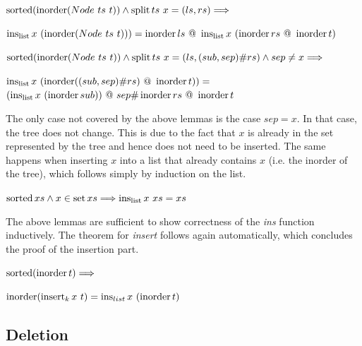 \begin{lemma}
    $\operatorname{sorted}(\operatorname{inorder} (Node\ ts\ t)) \wedge \operatorname{split} ts\ x = (ls, rs) \Longrightarrow$ \\
    \begin{center}
    $\operatorname{ins_{list}} x\ (\operatorname{inorder} (Node\ ts\ t))) = \operatorname{inorder} ls\ @\ \operatorname{ins_{list}} x\ (\operatorname{inorder} rs\ @\ \operatorname{inorder} t)$
    \end{center}
\end{lemma}

\begin{lemma}
    $\operatorname{sorted} (\operatorname{inorder} (Node\ ts\ t)) \wedge \operatorname{split} ts\ x = (ls, (sub,sep)\#rs) \wedge sep \neq x \Longrightarrow$ \\
    \begin{center}
    $\inslist x\ (\inorder ((sub,sep)\#rs)\ @\ \inorder t)) =$\\
    $ (\operatorname{ins_{list}} x\ (\operatorname{inorder} sub))\ @\ sep \# \operatorname{inorder} rs\ @\ \operatorname{inorder} t$
    \end{center}
\end{lemma}

The only case not covered by the above lemmas is the case $sep = x$.
In that case, the tree does not change.
This is due to the fact that $x$ is already in the set represented by the tree
and hence does not need to be inserted.
The same happens when inserting $x$ into a list that already contains $x$
(i.e. the inorder of the tree),
which follows simply by induction on the list.

\begin{lemma}
    $\operatorname{sorted} xs \wedge x \in \operatorname{set} xs \Longrightarrow \operatorname{ins_{list}} x\ xs = xs$
\end{lemma}

The above lemmas are sufficient to show correctness
of the \textit{ins} function inductively.
The theorem for \textit{insert} follows again automatically,
which concludes the proof of the insertion part.

\begin{theorem}
    \label{thm:ins-set}
    $\operatorname{sorted}  (\operatorname{inorder} t)\Longrightarrow$\\
    \begin{center}
    $\operatorname{inorder} (\operatorname{insert}_k x\ t) = \operatorname{ins}_{list} x\ (\operatorname{inorder} t)$
    \end{center}
\end{theorem}


\subsection{Deletion}


